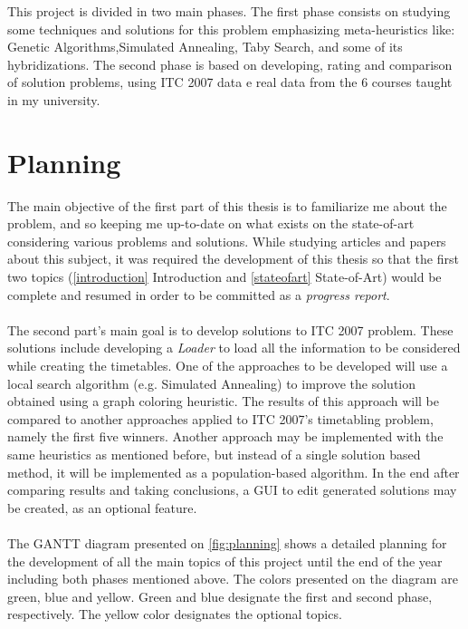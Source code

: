 This project is divided in two main phases. The first phase consists on studying some techniques and solutions for this problem emphasizing meta-heuristics like: Genetic Algorithms,Simulated Annealing, Taby Search, and some of its hybridizations. The second phase is based on developing, rating and comparison of solution problems, using ITC 2007 data e real data from the 6 courses taught in my university.


\section{Planning}

The main objective of the first part of this thesis is to familiarize me about the problem, and so keeping me up-to-date on what exists on the state-of-art considering various problems and solutions. While studying articles and papers about this subject, it was required the development of this thesis so that the first two topics (\ref{introduction} Introduction and \ref{stateofart} State-of-Art) would be complete and resumed in order to be committed as a \textit{progress report}.\\
\\
The second part's main goal is to develop solutions to ITC 2007 problem. These solutions include developing a \textit{Loader} to load all the information to be considered while creating the timetables. One of the approaches to be developed will use a local search algorithm (e.g. Simulated Annealing) to improve the solution obtained using a graph coloring heuristic. The results of this approach will be compared to another approaches applied to ITC 2007's timetabling problem, namely the first five winners. Another approach may be implemented with the same heuristics as mentioned before, but instead of a single solution based method, it will be implemented as a population-based algorithm. In the end after comparing results and taking conclusions, a GUI to edit generated solutions may be created, as an optional feature.\\
\\
The GANTT diagram presented on \ref{fig:planning} shows a detailed planning for the development of all the main topics of this project until the end of the year including both phases mentioned above. The colors presented on the diagram are green, blue and yellow. Green and blue designate the first and second phase, respectively. The yellow color designates the optional topics.\\


